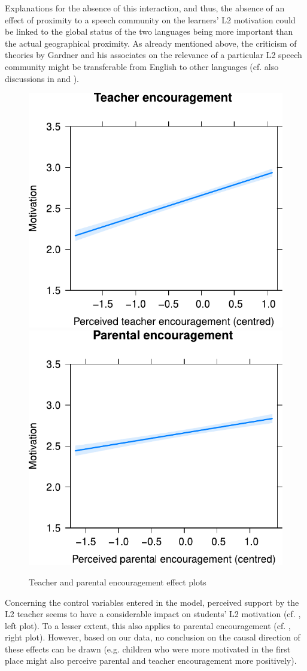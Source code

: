 \documentclass[output=paper]{langsci/langscibook}
\begin{document}
Explanations for the absence of this interaction, and thus, the absence of an effect of proximity to a speech community on the learners’ L2 motivation could be linked to the global status of the two languages being more important than the actual geographical proximity. As already mentioned above, the criticism of theories by Gardner and his associates on the relevance of a particular L2 speech community might be transferable from English to other languages (cf. also discussions in \citealt{Busse2017} and \citealt{Ushioda2017}).


\begin{figure}
\includegraphics[width=.45\textwidth]{figures/Fig7.3.1.pdf}\hfill%
\includegraphics[width=.45\textwidth]{figures/Fig7.3.2.pdf}
\caption{Teacher and parental encouragement effect plots\label{fig:07:3}}
\end{figure}

Concerning the control variables entered in the model, perceived support by the L2 teacher seems to have a considerable impact on students’ L2 motivation (cf. , left plot). To a lesser extent, this also applies to parental encouragement (cf. , right plot). However, based on our data, no conclusion on the causal direction of these effects can be drawn (e.g. children who were more motivated in the first place might also perceive parental and teacher encouragement more positively).
\end{document}
